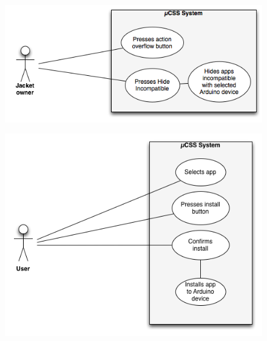 \begin{figure}[H]
\centering
\includegraphics[scale=0.7]{images/UseCase5}
\end{figure}



\begin{figure}[H]
\centering
\includegraphics[scale=0.7]{images/UseCase6}
\end{figure}

